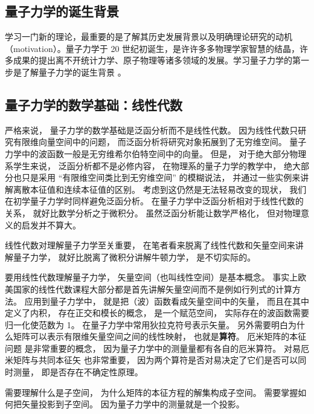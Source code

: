 
\begin{issues}
\issueTODO
\end{issues}
\subsection{量子力学的诞生背景}
学习一门新的理论，最重要的是了解其历史发展背景以及明确理论研究的动机（motivation）。量子力学于 20 世纪初诞生，是许许多多物理学家智慧的结晶，许多成果的提出离不开统计力学、原子物理等诸多领域的发展。学习量子力学的第一步是了解量子力学的诞生背景 。

\subsection{量子力学的数学基础：线性代数}
严格来说， 量子力学的数学基础是泛函分析而不是线性代数。 因为线性代数只研究有限维向量空间中的问题， 而泛函分析将研究对象拓展到了无穷维空间。 量子力学中的波函数一般是无穷维希尔伯特空间中的向量。 但是， 对于绝大部分物理系学生来说， 泛函分析都不是必修内容， 在物理系的量子力学的教学中， 绝大部分也只是采用 “有限维空间类比到无穷维空间” 的模糊说法， 并通过一些实例来讲解离散本征值和连续本征值的区别。 考虑到这仍然是无法轻易改变的现状， 我们在初学量子力学时同样避免泛函分析。 在量子力学中泛函分析相对于线性代数的关系， 就好比数学分析之于微积分。 虽然泛函分析能让数学严格化， 但对物理意义的启发并不算大。

线性代数对理解量子力学至关重要， 在笔者看来脱离了线性代数和矢量空间来讲解量子力学， 就好比脱离了微积分讲解牛顿力学， 是不切实际的。 

要用线性代数理解量子力学， 矢量空间（也叫线性空间）是基本概念。 事实上欧美国家的线性代数课程大部分都是首先讲解矢量空间而不是例如行列式的计算方法。 应用到量子力学中， 就是把（波）函数看成矢量空间中的矢量， 而且在其中定义了内积， 存在正交和模长的概念， 是一个赋范空间， 实际存在的波函数需要归一化使范数为 1。 在量子力学中常用狄拉克符号表示矢量。 另外需要明白为什么矩阵可以表示有限维矢量空间之间的线性映射， 也就是\textbf{算符}。 厄米矩阵的本征问题 是非常重要的概念， 因为量子力学中的测量量都有各自的厄米算符。 对易厄米矩阵与共同本征矢 也非常重要， 因为两个算符是否对易决定了它们是否可以同时测量， 即是否存在不确定性原理。

需要理解什么是子空间， 为什么矩阵的本征方程的解集构成子空间。 需要掌握如何把矢量投影到子空间。 因为量子力学中的测量就是一个投影。

